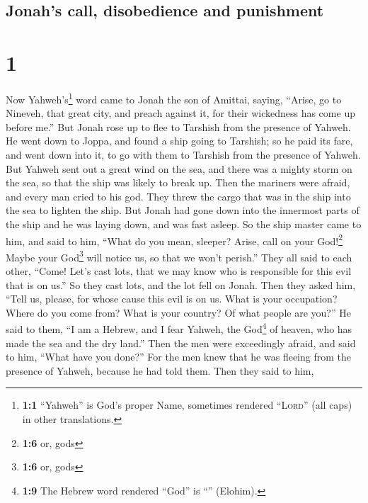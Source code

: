 \hypertarget{jonahs-call-disobedience-and-punishment}{%
\subsection{Jonah's call, disobedience and
punishment}\label{jonahs-call-disobedience-and-punishment}}

\hypertarget{section}{%
\section{1}\label{section}}

 Now Yahweh's\footnote{\textbf{1:1} ``Yahweh'' is God's
  proper Name, sometimes rendered ``\textsc{Lord}'' (all caps) in other
  translations.} word came to Jonah the son of Amittai, saying,
 ``Arise, go to Nineveh, that great city, and preach
against it, for their wickedness has come up before me.'' 
But Jonah rose up to flee to Tarshish from the presence of Yahweh. He
went down to Joppa, and found a ship going to Tarshish; so he paid its
fare, and went down into it, to go with them to Tarshish from the
presence of Yahweh.  But Yahweh sent out a great wind on
the sea, and there was a mighty storm on the sea, so that the ship was
likely to break up.  Then the mariners were afraid, and
every man cried to his god. They threw the cargo that was in the ship
into the sea to lighten the ship. But Jonah had gone down into the
innermost parts of the ship and he was laying down, and was fast asleep.
 So the ship master came to him, and said to him, ``What
do you mean, sleeper? Arise, call on your God!\footnote{\textbf{1:6} or,
  gods} Maybe your God\footnote{\textbf{1:6} or, gods} will notice us,
so that we won't perish.''  They all said to each other,
``Come! Let's cast lots, that we may know who is responsible for this
evil that is on us.'' So they cast lots, and the lot fell on Jonah.
 Then they asked him, ``Tell us, please, for whose cause
this evil is on us. What is your occupation? Where do you come from?
What is your country? Of what people are you?''  He said
to them, ``I am a Hebrew, and I fear Yahweh, the God\footnote{\textbf{1:9}
  The Hebrew word rendered ``God'' is ``'' (Elohim).} of
heaven, who has made the sea and the dry land.''  Then
the men were exceedingly afraid, and said to him, ``What have you
done?'' For the men knew that he was fleeing from the presence of
Yahweh, because he had told them.  Then they said to him,

